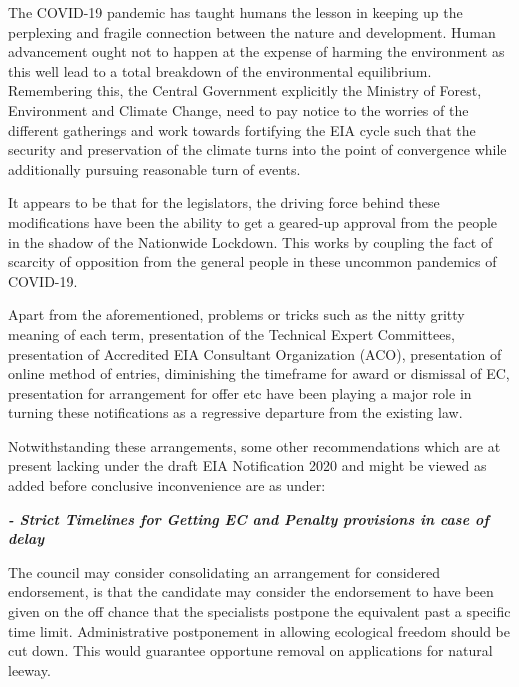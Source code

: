 \begin{multicols}{2}


\vspace{-.1cm}

\noi
The COVID-19 pandemic has taught humans the lesson in keeping up the perplexing and
fragile connection between the nature and development. Human advancement ought not to
happen at the expense of harming the environment as this well lead to a total breakdown of
the environmental equilibrium. Remembering this, the Central Government explicitly the
Ministry of Forest, Environment and Climate Change, need to pay notice to the worries of the
different gatherings and work towards fortifying the EIA cycle such that the security and
preservation of the climate turns into the point of convergence while additionally pursuing
reasonable turn of events.

\vspace{-.2cm}

\noi
It appears to be that for the legislators, the driving force behind these modifications have been
the ability to get a geared-up approval from the people in the shadow of the Nationwide
Lockdown. This works by coupling the fact of scarcity of opposition from the general people
in these uncommon pandemics of COVID-19.

\noi
Apart from the aforementioned, problems or tricks such as the nitty gritty meaning of each
term, presentation of the Technical Expert Committees, presentation of Accredited EIA
Consultant Organization (ACO), presentation of online method of entries, diminishing the
timeframe for award or dismissal of EC, presentation for arrangement for offer etc have been
playing a major role in turning these notifications as a regressive departure from the existing
law. 

\noi
Notwithstanding these arrangements, some other recommendations which are at present
lacking under the draft EIA Notification 2020 and might be viewed as added before
conclusive inconvenience are as under:

{\it\bfseries - Strict Timelines for Getting EC and Penalty provisions in case of delay}

\noi
The council may consider consolidating an arrangement for considered endorsement, is that
the candidate may consider the endorsement to have been given on the off chance that the
specialists postpone the equivalent past a specific time limit. Administrative postponement in
allowing ecological freedom should be cut down. This would guarantee opportune removal
on applications for natural leeway.


\end{multicols}

